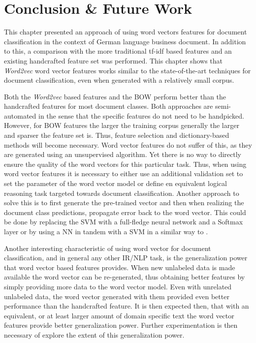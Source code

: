 



\section{Conclusion \& Future Work}
\label{sec:w2v4tc_conclusion}

This chapter presented an approach  of using  word vectors features for
document classification in the context of German language business document.
In addition to this,  a comparison with the more
traditional \ac{tf-idf}  based features and an existing handcrafted
feature set was performed. This chapter shows that \textit{Word2vec} word
vector features works similar to the state-of-the-art techniques for document
classification, even when generated  with a relatively small corpus.

Both the \textit{Word2vec} based features and the \ac{BOW} perform
better than the handcrafted features for most document classes. Both
 approaches are semi-automated in the sense that the specific
features do not need to be handpicked. However, for \ac{BOW} features the larger the training
corpus generally the larger and sparser the feature set is. Thus, feature
selection and dictionary-based methods will become  necessary.
Word vector features do not suffer of this, as they are  generated using an unsupervised
algorithm. Yet there is no way to directly ensure the quality of the word
vectors for this particular task. Thus, when using  word vector
features it is necessary to either  use an additional validation set  to set
the parameter of the word vector model or define en equivalent logical
reasoning task targeted towards document
classification.   Another approach to solve this is to first generate the pre-trained vector
and then when realizing the document class predictions, propagate error back
to the word vector. This could be done by replacing the \ac{SVM} with a
full-fledge neural network and a Softmax layer or by using a \ac{NN} in tandem with a \ac{SVM} in a
similar way to \cite{DBLP:journals/corr/Tang13}.


Another interesting characteristic of using word vector for document
classification, and in general any other \ac{IR}/\ac{NLP} task,  is the
generalization power that word vector based features provides.
When new unlabeled data is made available the word vector can be
re-generated, thus obtaining better features by simply providing more data to
the word vector model. Even with unrelated  unlabeled data, the word vector
generated with them provided even better performance than the handcrafted
feature. It is then expected then, that with an equivalent, or at least larger
amount of domain specific text the word vector features provide better
generalization power. Further experimentation is then necessary  of
explore the extent of this generalization power.

